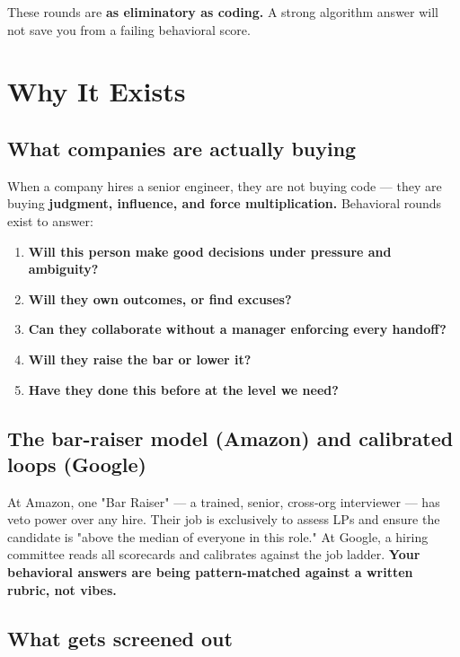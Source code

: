 \documentclass[11pt]{article}
\providecommand{\tightlist}{\setlength{\itemsep}{1pt}\setlength{\parskip}{0pt}}
\begin{document}
These rounds are \textbf{as eliminatory as coding.} A strong algorithm answer will not save you from a failing behavioral score.

\section{Why It Exists}\label{why-it-exists}

\subsection{What companies are actually buying}\label{what-companies-are-actually-buying}

When a company hires a senior engineer, they are not buying code --- they are buying \textbf{judgment, influence, and force multiplication.} Behavioral rounds exist to answer:

\begin{enumerate}
\def\labelenumi{\arabic{enumi}.}
\tightlist
\item
  \textbf{Will this person make good decisions under pressure and ambiguity?}
\item
  \textbf{Will they own outcomes, or find excuses?}
\item
  \textbf{Can they collaborate without a manager enforcing every handoff?}
\item
  \textbf{Will they raise the bar or lower it?}
\item
  \textbf{Have they done this before at the level we need?}
\end{enumerate}

\subsection{The bar-raiser model (Amazon) and calibrated loops (Google)}\label{the-bar-raiser-model-amazon-and-calibrated-loops-google}

At Amazon, one "Bar Raiser" --- a trained, senior, cross-org interviewer --- has veto power over any hire. Their job is exclusively to assess LPs and ensure the candidate is "above the median of everyone in this role." At Google, a hiring committee reads all scorecards and calibrates against the job ladder. \textbf{Your behavioral answers are being pattern-matched against a written rubric, not vibes.}

\subsection{What gets screened out}\label{what-gets-screened-out}
\end{document}
